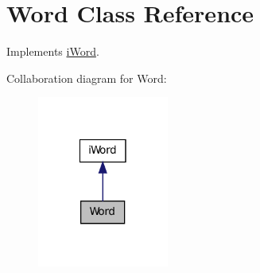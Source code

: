\hypertarget{classWord}{
\section{Word Class Reference}
\label{classWord}
}


Implements \hyperlink{classiWord}{iWord}.  




Collaboration diagram for Word:\nopagebreak
\begin{figure}[H]
\begin{center}
\leavevmode
\includegraphics[width=122pt]{classWord__coll__graph}
\end{center}
\end{figure}
